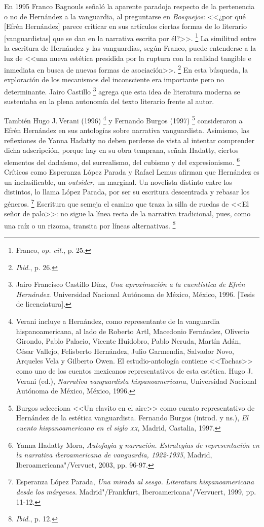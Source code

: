 \documentclass[14pt,twoside,final]{extbook} %
\let\oldfootnote\footnote
\renewcommand\footnote[1]{%
\oldfootnote{\hspace{1mm}#1}}
\begin{document}
En 1995 Franco Bagnouls señaló la aparente paradoja respecto de la pertenencia o no de Hernández a la vanguardia, al preguntarse en \emph{Bosquejos}: <<¿por qué [Efrén Hernández] parece criticar en sus artículos ciertas formas de lo literario [vanguardistas] que se dan en la narrativa escrita por él?>>.\footnote{Franco, \emph{op. cit.}, p. 25.} La similitud entre la escritura de Hernández y las vanguardias, según Franco, puede entenderse a la luz de <<una nueva estética presidida por la ruptura con la realidad tangible e inmediata en busca de nuevas formas de asociación>>.\footnote{\emph{Ibid.}, p. 26.} En esta búsqueda, la exploración de los mecanismos del inconsciente era importante pero no determinante. Jairo Castillo\footnote{Jairo Francisco Castillo Díaz, \emph{Una aproximación a la cuentística de Efrén Hernández}. Universidad Nacional Autónoma de México, México, 1996. [Tesis de licenciatura].} agrega que esta idea de literatura moderna se sustentaba en la plena autonomía del texto literario frente al autor.

También Hugo J.\,Verani (1996)\footnote{Verani incluye a Hernández, como representante de la vanguardia hispanoamericana, al lado de Roberto Artl, Macedonio Fernández, Oliverio Girondo, Pablo Palacio, Vicente Huidobro, Pablo Neruda, Martín Adán, César Vallejo, Felisberto Hernández, Julio Garmendia, Salvador Novo, Arqueles Vela y Gilberto Owen. El estudio-antología contiene <<Tachas>> como uno de los cuentos mexicanos representativos de esta estética. Hugo J.\,Verani (ed.), \emph{Narrativa vanguardista hispanoamericana}, Universidad Nacional Autónoma de México, México, 1996.} y Fernando Burgos (1997)\footnote{Burgos selecciona <<Un clavito en el aire>> como cuento representativo de Hernández de la estética vanguardista. Fernando Burgos (introd. y ns.), \emph{El cuento hispanoamericano en el siglo \textsc{xx}}, Madrid, Castalia, 1997.} consideraron a Efrén Hernández en sus antologías sobre narrativa vanguardista. Asimismo, las reflexiones de Yanna Hadatty no deben perderse de vista al intentar comprender dicha adscripción, porque hay en su obra temprana, señala Hadatty, ciertos elementos del dadaísmo, del surrealismo, del cubismo y del expresionismo.\footnote{Yanna Hadatty Mora, \emph{Autofagia y narración. Estrategias de representación en la narrativa iberoamericana de vanguardia, 1922-1935}, Madrid, Iberoamericana"/Vervuet, 2003, pp. 96-97.} Críticos como Esperanza López Parada y Rafael Lemus afirman que Hernández
es un inclasificable, un \emph{outsider}, un marginal. Un novelista distinto entre los distintos, lo llama López Parada, por ser su escritura descentrada y rebasar los géneros.\footnote{Esperanza López Parada, \emph{Una mirada al sesgo. Literatura hispanoamericana desde los márgenes}. Madrid"/Frankfurt, Iberoamericana"/Vervuert, 1999, pp. 11-12.} Escritura que semeja el camino que traza la silla de ruedas de <<El señor de palo>>: no sigue la línea recta de la narrativa tradicional, pues, como una raíz o un rizoma, transita por líneas alternativas.\footnote{\emph{Ibid.}, p. 12.}
\end{document}
